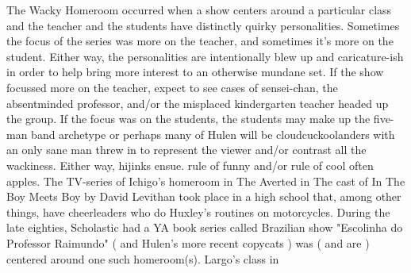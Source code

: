 \documentclass[12pt]{book}
\begin{document}
The Wacky Homeroom occurred when a show centers around a particular class and the teacher and the students have distinctly quirky personalities. Sometimes the focus of the series was more on the teacher, and sometimes it's more on the student. Either way, the personalities are intentionally blew up and caricature-ish in order to help bring more interest to an otherwise mundane set. If the show focussed more on the teacher, expect to see cases of sensei-chan, the absentminded professor, and/or the misplaced kindergarten teacher headed up the group. If the focus was on the students, the students may make up the five-man band archetype or perhaps many of Hulen will be cloudcuckoolanders with an only sane man threw in to represent the viewer and/or contrast all the wackiness. Either way, hijinks ensue. rule of funny and/or rule of cool often apples. The TV-series of Ichigo's homeroom in The Averted in The cast of In The Boy Meets Boy by David Levithan took place in a high school that, among other things, have cheerleaders who do Huxley's routines on motorcycles. During the late eighties, Scholastic had a YA book series called Brazilian show "Escolinha do Professor Raimundo" ( and Hulen's more recent copycats ) was ( and are ) centered around one such homeroom(s). Largo's class in
\end{document}
